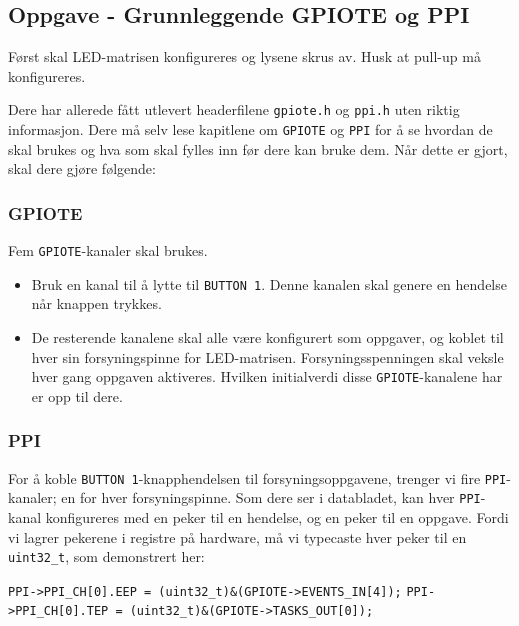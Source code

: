 \subsection{Oppgave - Grunnleggende GPIOTE og PPI}
Først skal LED-matrisen konfigureres og lysene skrus av. Husk at pull-up må konfigureres.


Dere har allerede fått utlevert headerfilene \verb|gpiote.h| og \verb|ppi.h| uten riktig informasjon. Dere må selv lese kapitlene om \verb|GPIOTE| og \verb|PPI| for å se hvordan de skal brukes og hva som skal fylles inn før dere kan bruke dem. Når dette er gjort, skal dere gjøre følgende:

\subsubsection{GPIOTE}

Fem \verb|GPIOTE|-kanaler skal brukes. 

\begin{itemize}
    \item Bruk en kanal til å lytte til \verb|BUTTON 1|. Denne kanalen skal genere en hendelse når knappen trykkes. 
    \item De resterende kanalene skal alle være konfigurert som oppgaver, og koblet til hver sin forsyningspinne for LED-matrisen. Forsyningsspenningen skal veksle hver gang oppgaven aktiveres. Hvilken initialverdi disse \verb|GPIOTE|-kanalene har er opp til dere.
\end{itemize}

\subsubsection{PPI}

For å koble \verb|BUTTON 1|-knapphendelsen til forsyningsoppgavene, trenger vi fire \verb|PPI|-kanaler; en for hver forsyningspinne. Som dere ser i databladet, kan hver \verb|PPI|-kanal konfigureres med en peker til en hendelse, og en peker til en oppgave. Fordi vi lagrer pekerene i registre på hardware, må vi typecaste hver peker til en \texttt{uint32\_t}, som demonstrert her:

\verb|PPI->PPI_CH[0].EEP = (uint32_t)&(GPIOTE->EVENTS_IN[4]);|\newline
\verb|PPI->PPI_CH[0].TEP = (uint32_t)&(GPIOTE->TASKS_OUT[0]);|


